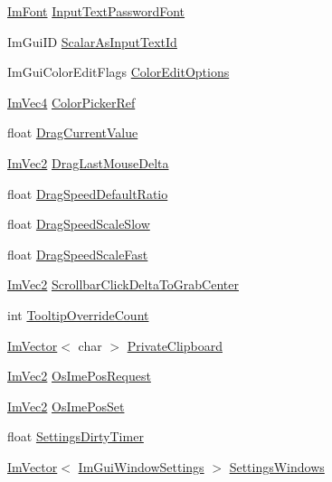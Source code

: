 \begin{DoxyCompactItemize}
\hyperlink{struct_im_font}{Im\+Font} \hyperlink{struct_im_gui_context_a6aa67b9b778bd741d9866ec34cc8ee8b}{Input\+Text\+Password\+Font}
\item 
Im\+Gui\+ID \hyperlink{struct_im_gui_context_af7d6712f53762d620c4d4dac89dbc222}{Scalar\+As\+Input\+Text\+Id}
\item 
Im\+Gui\+Color\+Edit\+Flags \hyperlink{struct_im_gui_context_a122394766b40cdb6cbd8a40fbe6ac680}{Color\+Edit\+Options}
\item 
\hyperlink{struct_im_vec4}{Im\+Vec4} \hyperlink{struct_im_gui_context_ae3a119a9a71b31ede7ccc87447627b68}{Color\+Picker\+Ref}
\item 
float \hyperlink{struct_im_gui_context_a96ed5993aaddb183dc36244912ea261f}{Drag\+Current\+Value}
\item 
\hyperlink{struct_im_vec2}{Im\+Vec2} \hyperlink{struct_im_gui_context_a804ee75ff62a35d2955ecf7917e704f9}{Drag\+Last\+Mouse\+Delta}
\item 
float \hyperlink{struct_im_gui_context_aea2d961c03a1d0879088385d8cf602dd}{Drag\+Speed\+Default\+Ratio}
\item 
float \hyperlink{struct_im_gui_context_a69df3a201fa28cf99b6a442d506806a0}{Drag\+Speed\+Scale\+Slow}
\item 
float \hyperlink{struct_im_gui_context_ac12072b2fbfca44e4d8b9775cb8cfa21}{Drag\+Speed\+Scale\+Fast}
\item 
\hyperlink{struct_im_vec2}{Im\+Vec2} \hyperlink{struct_im_gui_context_a07456ba31300e2ee1cb1827dfbd02fe6}{Scrollbar\+Click\+Delta\+To\+Grab\+Center}
\item 
int \hyperlink{struct_im_gui_context_a1c6e3c1b866fa1abf473d3cd9eafce0f}{Tooltip\+Override\+Count}
\item 
\hyperlink{class_im_vector}{Im\+Vector}$<$ char $>$ \hyperlink{struct_im_gui_context_a4ba950183c7c5e401ca4113e09b1ced4}{Private\+Clipboard}
\item 
\hyperlink{struct_im_vec2}{Im\+Vec2} \hyperlink{struct_im_gui_context_af98a8f8b9c96bf8b692449daedf45602}{Os\+Ime\+Pos\+Request}
\item 
\hyperlink{struct_im_vec2}{Im\+Vec2} \hyperlink{struct_im_gui_context_a466a0975ad72e7e3deaea6bcfb6b446d}{Os\+Ime\+Pos\+Set}
\item 
float \hyperlink{struct_im_gui_context_a7e0dd3aef4a4f0fd85ed39e13824f2ab}{Settings\+Dirty\+Timer}
\item 
\hyperlink{class_im_vector}{Im\+Vector}$<$ \hyperlink{struct_im_gui_window_settings}{Im\+Gui\+Window\+Settings} $>$ \hyperlink{struct_im_gui_context_a19273d7eb5a729463c042671ae27ca58}{Settings\+Windows}

\end{DoxyCompactItemize}
